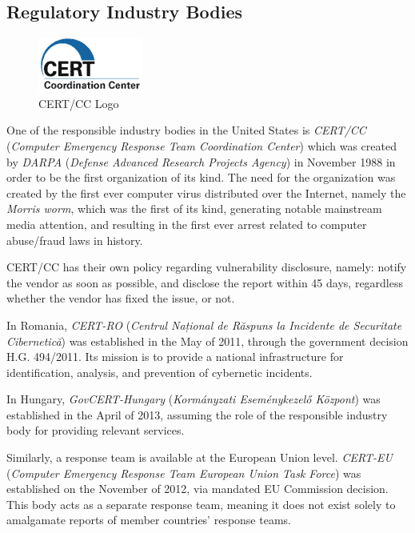 \documentclass[a4paper,12pt]{article}
\begin{document}
\subsection{Regulatory Industry Bodies}
 
	
	\begin{figure}
		\vspace{-10pt}
		\centering
		\includegraphics[scale=0.75]{cert.png}
		\caption[Computer Emergency Response Team Coordination Center logo]{CERT/CC Logo\cite{cert15}}
	\end{figure}
	
	One of the responsible industry bodies in the United States is \textit{CERT/CC} (\textit{Computer Emergency Response Team Coordination Center}) which was created by \textit{DARPA} (\textit{Defense Advanced Research Projects Agency}) in November 1988 in order to be the first organization of its kind. The need for the organization was created by the first ever computer virus distributed over the Internet, namely the \textit{Morris worm}\cite{cert15}, which was the first of its kind, generating notable mainstream media attention, and resulting in the first ever arrest related to computer abuse/fraud laws in history.
	
	CERT/CC has their own policy regarding vulnerability disclosure, namely: notify the vendor as soon as possible, and disclose the report within 45 days, regardless whether the vendor has fixed the issue, or not.
	
	In Romania, \textit{CERT-RO} (\textit{Centrul Național de Răspuns la Incidente de Securitate Cibernetică}) was established in the May of 2011, through the government decision H.G. 494/2011\cite{certro12}. Its mission is to provide a national infrastructure for identification, analysis, and prevention of cybernetic incidents.
	
	In Hungary, \textit{GovCERT-Hungary} (\textit{Kormányzati Eseménykezelő Központ}) was established in the April of 2013\cite{certhu13}, assuming the role of the responsible industry body for providing relevant services.
	
	Similarly, a response team is available at the European Union level. \textit{CERT-EU} (\textit{Computer Emergency Response Team European Union Task Force}) was established on the November of 2012\cite{certeu13}, via mandated EU Commission decision. This body acts as a separate response team, meaning it does not exist solely to amalgamate reports of member countries' response teams.
	
\end{document}
